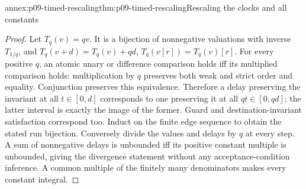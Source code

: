 \begin{annexitem}{annex:p09-timed-rescaling}{thm:p09-timed-rescaling}{Rescaling the clocks and all constants}
\begin{proof}
Let \(T_q(v)=qv\). It is a bijection of nonnegative valuations with inverse
\(T_{1/q}\), and
\(T_q(v+d)=T_q(v)+qd\), \(T_q(v[r])=T_q(v)[r]\).
For every positive \(q\), an atomic unary or difference comparison holds
iff its multiplied comparison holds: multiplication by \(q\) preserves
both weak and strict order and equality. Conjunction preserves this
equivalence. Therefore a delay preserving the invariant at all
\(t\in[0,d]\) corresponds to one preserving it at all
\(qt\in[0,qd]\); the latter interval is exactly the image of the former.
Guard and destination-invariant satisfaction correspond too. Induct on the
finite edge sequence to obtain the stated run bijection. Conversely divide
the values and delays by \(q\) at every step. A sum of nonnegative delays
is unbounded iff its positive constant multiple is unbounded, giving the
divergence statement without any acceptance-condition inference. A common
multiple of the finitely many denominators makes every constant integral.
\end{proof}
\end{annexitem}

